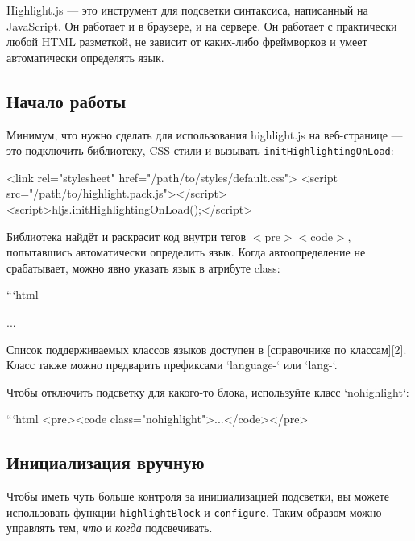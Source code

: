 Highlight.\+js — это инструмент для подсветки синтаксиса, написанный на Java\+Script. Он работает и в браузере, и на сервере. Он работает с практически любой H\+T\+ML разметкой, не зависит от каких-\/либо фреймворков и умеет автоматически определять язык.

\subsection*{Начало работы}

Минимум, что нужно сделать для использования highlight.\+js на веб-\/странице — это подключить библиотеку, C\+S\+S-\/стили и вызывать \href{http://highlightjs.readthedocs.io/en/latest/api.html#inithighlightingonload}{\tt {\ttfamily init\+Highlighting\+On\+Load}}\+:


\begin{DoxyCode}
<link rel="stylesheet" href="/path/to/styles/default.css">
<script src="/path/to/highlight.pack.js"></script>
<script>hljs.initHighlightingOnLoad();</script>
\end{DoxyCode}


Библиотека найдёт и раскрасит код внутри тегов {\ttfamily $<$pre$>$$<$code$>$}, попытавшись автоматически определить язык. Когда автоопределение не срабатывает, можно явно указать язык в атрибуте class\+:

```html 
\begin{DoxyPre}{\ttfamily ...}\end{DoxyPre}
 
\begin{DoxyCode}
Список поддерживаемых классов языков доступен в [справочнике по классам][2].
Класс также можно предварить префиксами `language-` или `lang-`.

Чтобы отключить подсветку для какого-то блока, используйте класс `nohighlight`:

```html
<pre><code class="nohighlight">...</code></pre>
\end{DoxyCode}


\subsection*{Инициализация вручную}

Чтобы иметь чуть больше контроля за инициализацией подсветки, вы можете использовать функции \href{http://highlightjs.readthedocs.io/en/latest/api.html#highlightblock-block}{\tt {\ttfamily highlight\+Block}} и \href{http://highlightjs.readthedocs.io/en/latest/api.html#configure-options}{\tt {\ttfamily configure}}. Таким образом можно управлять тем, {\itshape что} и {\itshape когда} подсвечивать.


